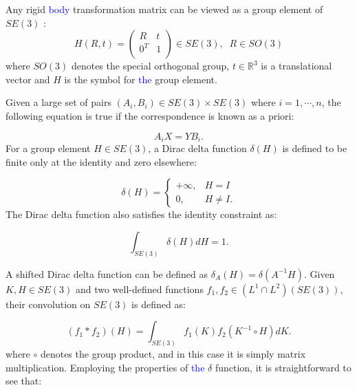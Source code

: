 \documentclass[letterpaper, 10 pt, conference]{ieeeconf}  %
\begin{document}
Any rigid \textcolor{blue}{body} transformation matrix can be viewed as a group element of $SE(3)$ :
\begin{equation}\label{equ0}
    H(R,t)=\left(
             \begin{array}{cc}
               R & t \\
               0^{T} & 1 \\
             \end{array}
           \right) \in SE(3), \; \; R \in SO(3)
\end{equation}
where $SO(3)$ denotes the special orthogonal group, $t \in \mathbb{R}^3 $ is a translational vector and $H$ is the symbol for \textcolor{blue}{the} group element.

Given a large set of pairs $(A_{i},B_{i})\in SE(3)\times SE(3)$ where $i=1,\cdots,n$, the following equation is true if the correspondence is known as a priori:

\begin{equation}\label{equ1}
A_{i}X=YB_{i}.
\end{equation}
For a group element $H \in SE(3)$, a Dirac delta function $\delta(H)$ is defined to be finite only at the identity and zero elsewhere:

\begin{equation}\label{equ2}
\delta{(H)}=
\left\{
\begin{array}{ll}
+\infty, & H=I \\
0, & H \neq I.
\end{array}
\right.
\end{equation}
The Dirac delta function also satisfies the identity constraint as:

\begin{equation}\label{equ3}
\int_{SE(3)}\delta{(H)}dH=1.
\end{equation}

A shifted Dirac delta function can be defined as $\delta_{A}(H)=\delta{(A^{-1}H)}$. Given $K,H \in SE(3)$ and two well-defined functions $f_{1}, f_{2} \in \left(L^1 \cap L^2 \right)(SE(3))$, their convolution on $SE(3)$ is defined as:

\begin{equation}\label{equ4}
(f_{1}\ast f_{2})(H)=\int_{SE(3)}f_{1}(K)f_{2}(K^{-1}\circ H)dK.
\end{equation}
where $\circ$ denotes the group product, and in this case it is simply matrix multiplication.
Employing the properties of \textcolor{blue}{the} $\delta$ function, it is straightforward to see that:
\end{document}
